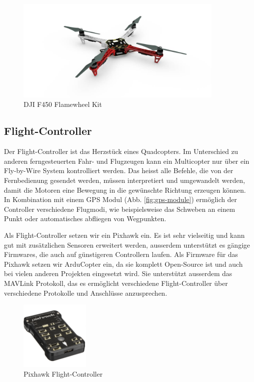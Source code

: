 \begin{figure}[h]
\centering
\includegraphics[width=0.9\textwidth] {images/hardware/f450.jpg} 
\caption{DJI F450 Flamewheel Kit}
\label{fig:f450}
\end{figure}


\subsection{Flight-Controller}

Der Flight-Controller ist das Herzstück eines Quadcopters. Im Unterschied zu anderen ferngesteuerten Fahr- und Flugzeugen kann ein Multicopter nur über ein Fly-by-Wire System kontrolliert werden. Das heisst alle Befehle, die von der Fernbedienung gesendet werden, müssen interpretiert und umgewandelt werden, damit die Motoren eine Bewegung in die gewünschte Richtung erzeugen können. In Kombination mit einem GPS Modul (Abb. \ref{fig:gps-module}) ermöglich der Controller verschiedene Flugmodi, wie beispielsweise das Schweben an einem Punkt oder automatisches abfliegen von Wegpunkten.

Als Flight-Controller setzen wir ein Pixhawk ein. Es ist sehr vielseitig und kann gut mit zusätzlichen Sensoren erweitert werden, ausserdem unterstützt es gängige Firmwares, die auch auf günstigeren Controllern laufen. Als Firmware für das Pixhawk setzen wir ArduCopter ein, da sie komplett Open-Source ist und auch bei vielen anderen Projekten eingesetzt wird. Sie unterstützt ausserdem das \Gls{MAVLink} Protokoll, das es ermöglicht verschiedene Flight-Controller über verschiedene Protokolle und Anschlüsse anzusprechen.

\begin{figure}[h]
\centering
\includegraphics[width=0.3\textwidth] {images/hardware/pixhawk.jpg} 
\caption{Pixhawk Flight-Controller}
\label{fig:pixhawk}
\end{figure}

